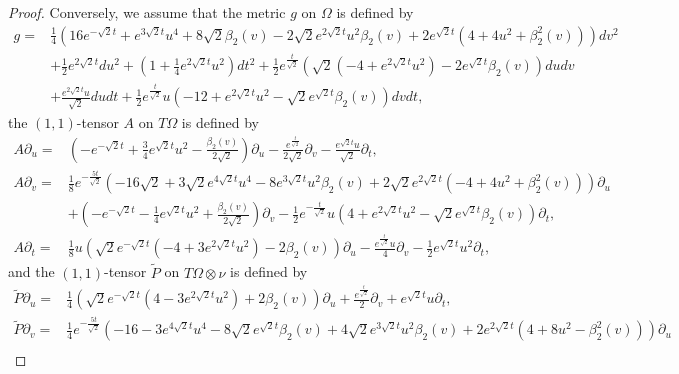\documentclass[reqno]{amsart}%
\theoremstyle{definition}
\numberwithin{equation}{section}
\begin{document}
\begin{proof}
Conversely, we assume that the metric $g$ on $\Omega$ is defined by
%
\begin{equation}\label{eqn:3.1ffff3}
\begin{aligned}
g=&\frac{1}{4}(16 e^{-\sqrt{2}t}+e^{3 \sqrt{2}t}u^4+8\sqrt{2}\beta_2(v)
-2\sqrt{2}e^{2\sqrt{2}t}u^2\beta_2(v)+2e^{\sqrt{2}t}(4+4u^2+\beta_2^2(v)))dv^2\\
&+\frac{1}{2}e^{2\sqrt{2}t}du^2+(1+\frac{1}{4}e^{2\sqrt{2}t}u^2)dt^2+\frac{1}{2}e^{\frac{t}{\sqrt{2}}}(\sqrt{2}(-4+e^{2\sqrt{2}t}u^2)-2e^{\sqrt{2}t}\beta_2(v))dudv\\
&+\frac{e^{2\sqrt{2}t}u}{\sqrt{2}}dudt
+\frac{1}{2}e^{\frac{t}{\sqrt{2}}}u(-12+e^{2\sqrt{2}t}u^2-\sqrt{2}e^{\sqrt{2}t}\beta_2(v))dvdt,
\end{aligned}
\end{equation}
the $(1,1)$-tensor $A$ on $T\Omega$ is defined by
\begin{equation}\label{eqn:3.1ffff4}
\begin{aligned}
A\partial_u=&(-e^{-\sqrt{2}t}+\frac{3}{4}e^{\sqrt{2}t}u^2-\frac{\beta_2(v)}{2\sqrt{2}})\partial_u
-\frac{e^{\frac{t}{\sqrt{2}}}}{2\sqrt{2}}\partial_v-\frac{e^{\sqrt{2}t}u}{\sqrt{2}}\partial_t,\\
A\partial_v=&\frac{1}{8}e^{-\frac{5t}{\sqrt{2}}}(-16\sqrt{2}+3\sqrt{2}e^{4\sqrt{2}t}u^4-8e^{3\sqrt{2}t} u^2\beta_2(v)+2\sqrt{2}e^{2\sqrt{2}t}(-4+4u^2+\beta_2^2(v)))\partial_u\\
&+(-e^{-\sqrt{2}t}-\frac{1}{4}e^{\sqrt{2}t}u^2+\frac{\beta_2(v)}{2\sqrt{2}})\partial_v
-\frac{1}{2}e^{-\frac{t}{\sqrt{2}}}u(4+e^{2\sqrt{2}t}u^2-\sqrt{2}e^{\sqrt{2}t}\beta_2(v))\partial_t,\\
A\partial_t=&\frac{1}{8}u(\sqrt{2}e^{-\sqrt{2}t}(-4+3e^{2\sqrt{2}t}u^2)-2\beta_2(v))\partial_u
-\frac{e^{\frac{t}{\sqrt{2}}}u}{4}\partial_v-\frac{1}{2}e^{\sqrt{2}t}u^2\partial_t,
\end{aligned}
\end{equation}
and the $(1,1)$-tensor $\tilde{P}$ on $T\Omega\otimes \nu$ is defined by
\begin{equation}\label{eqn:3.1ffff5}
\begin{aligned}
\tilde{P}\partial_u=&\frac{1}{4}(\sqrt{2}e^{-\sqrt{2}t}(4-3e^{2\sqrt{2}t}u^2)+2 \beta_2(v))\partial_u+\frac{e^{\frac{t}{\sqrt{2}}}}{2}\partial_v
+e^{\sqrt{2}t}u\partial_t,\\
\tilde{P}\partial_v=&\frac{1}{4}e^{-\frac{5t}{\sqrt{2}}}(-16-3e^{4\sqrt{2}t}u^4-8\sqrt{2}e^{\sqrt{2}t} \beta_2(v)+4\sqrt{2}e^{3\sqrt{2}t}u^2\beta_2(v)+2e^{2\sqrt{2}t}(4+8u^2-\beta_2^2(v)))\partial_u\\

\end{aligned}
\end{equation}
\end{proof}
\end{document}
